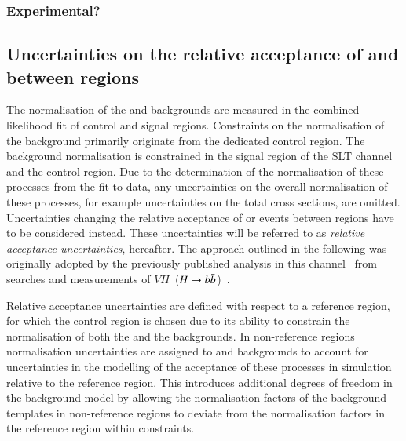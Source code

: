 

\subsubsection{Experimental?}








\subsection{Uncertainties on the relative acceptance of \ZHF and
  \ttbar between regions}

The normalisation of the \ZHF and \ttbar backgrounds are measured in
the combined likelihood fit of control and signal regions. Constraints
on the normalisation of the \ZHF background primarily originate from
the dedicated control region. The \ttbar background normalisation is
constrained in the signal region of the \lephad SLT channel and the
\ZHF control region. Due to the determination of the normalisation of
these processes from the fit to data, any uncertainties on the overall
normalisation of these processes, for example uncertainties on the
total cross sections, are omitted. Uncertainties changing the relative
acceptance of \ZHF or \ttbar events between regions have to be
considered instead. These uncertainties will be referred to as
\emph{relative acceptance uncertainties}, hereafter. The approach
outlined in the following was originally adopted by the previously
published analysis in this channel~\cite{HIGG-2016-16-witherratum}
from searches and measurements of
$VH$~($H\to b\bar{b}$)~\cite{HIGG-2016-29,HIGG-2018-04,HIGG-2018-51}.

Relative acceptance uncertainties are defined with respect to a
reference region, for which the \ZHF control region is chosen due to
its ability to constrain the normalisation of both the \ZHF and the
\ttbar backgrounds. In non-reference regions normalisation
uncertainties are assigned to \ZHF and \ttbar backgrounds to account
for uncertainties in the modelling of the acceptance of these
processes in simulation relative to the reference region. This
introduces additional degrees of freedom in the background model by
allowing the normalisation factors of the background templates in
non-reference regions to deviate from the normalisation factors in the
reference region within constraints.


